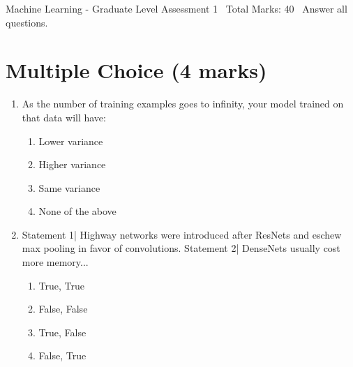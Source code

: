 \documentclass[12pt]{article}
\begin{document}
\begin{center}
Machine Learning - Graduate Level Assessment 1 \
Total Marks: 40 \
Answer all questions.
\end{center}

\section*{Multiple Choice (4 marks)}
\begin{enumerate}[label=\arabic*.]
\item As the number of training examples goes to infinity, your model trained on that data will have:
\begin{enumerate}[label=(\alph*)]
    \item Lower variance
    \item Higher variance
    \item Same variance
    \item None of the above
\end{enumerate}
\item Statement 1| Highway networks were introduced after ResNets and eschew max pooling in favor of convolutions. Statement 2| DenseNets usually cost more memory...
\begin{enumerate}[label=(\alph*)]
    \item True, True
    \item False, False
    \item True, False
    \item False, True
\end{enumerate}
\end{enumerate}
\end{document}
